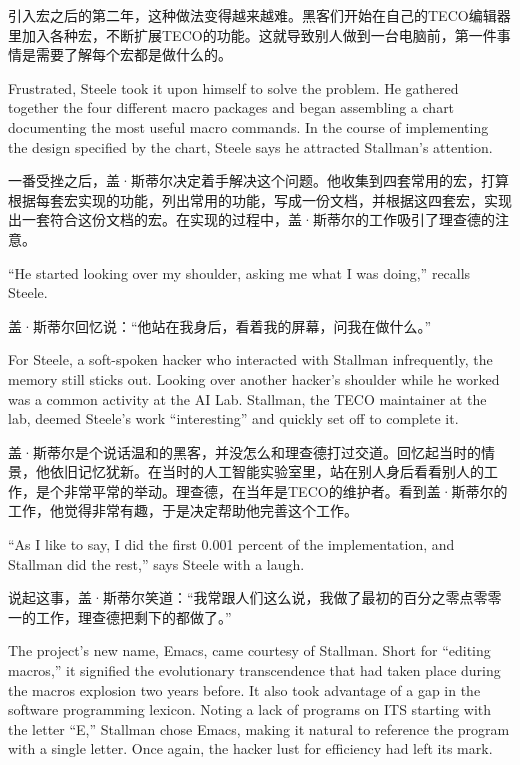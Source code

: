 \ifdefined\chs
引入宏之后的第二年，这种做法变得越来越难。黑客们开始在自己的TECO编辑器里加入各种宏，不断扩展TECO的功能。这就导致别人做到一台电脑前，第一件事情是需要了解每个宏都是做什么的。
\fi

\ifdefined\eng
Frustrated, Steele took it upon himself to solve the problem. He gathered together the four different macro packages and began assembling a chart documenting the most useful macro commands. In the course of implementing the design specified by the chart, Steele says he attracted Stallman's attention.
\fi

\ifdefined\chs
一番受挫之后，盖·斯蒂尔决定着手解决这个问题。他收集到四套常用的宏，打算根据每套宏实现的功能，列出常用的功能，写成一份文档，并根据这四套宏，实现出一套符合这份文档的宏。在实现的过程中，盖·斯蒂尔的工作吸引了理查德的注意。
\fi

\ifdefined\eng
``He started looking over my shoulder, asking me what I was doing,'' recalls Steele.
\fi

\ifdefined\chs
盖·斯蒂尔回忆说：“他站在我身后，看着我的屏幕，问我在做什么。”
\fi

\ifdefined\eng
For Steele, a soft-spoken hacker who interacted with Stallman infrequently, the memory still sticks out. Looking over another hacker's shoulder while he worked was a common activity at the AI Lab. Stallman, the TECO maintainer at the lab, deemed Steele's work ``interesting'' and quickly set off to complete it.
\fi

\ifdefined\chs
盖·斯蒂尔是个说话温和的黑客，并没怎么和理查德打过交道。回忆起当时的情景，他依旧记忆犹新。在当时的人工智能实验室里，站在别人身后看看别人的工作，是个非常平常的举动。理查德，在当年是TECO的维护者。看到盖·斯蒂尔的工作，他觉得非常有趣，于是决定帮助他完善这个工作。
\fi

\ifdefined\eng
``As I like to say, I did the first 0.001 percent of the implementation, and Stallman did the rest,'' says Steele with a laugh.
\fi

\ifdefined\chs
说起这事，盖·斯蒂尔笑道：“我常跟人们这么说，我做了最初的百分之零点零零一的工作，理查德把剩下的都做了。”
\fi

\ifdefined\eng
The project's new name, Emacs, came courtesy of Stallman. Short for ``editing macros,'' it signified the evolutionary transcendence that had taken place during the macros explosion two years before. It also took advantage of a gap in the software programming lexicon. Noting a lack of programs on ITS starting with the letter ``E,'' Stallman chose Emacs, making it natural to reference the program with a single letter. Once again, the hacker lust for efficiency had left its mark.
\fi


